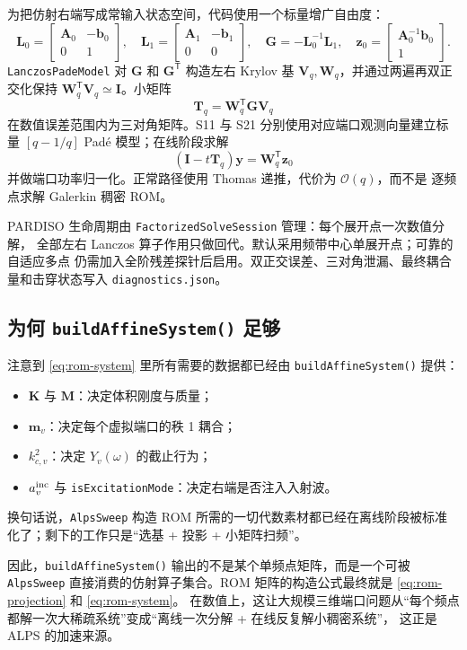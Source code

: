 \documentclass[UTF8,a4paper,11pt]{ctexart}
\newcommand{\transpose}{\mathsf{T}}
\newcommand{\code}[1]{\texttt{\small #1}}
\begin{document}
为把仿射右端写成常输入状态空间，代码使用一个标量增广自由度：
\begin{equation}
 \bm L_0=\begin{bmatrix}\bm A_0&-\bm b_0\\0&1\end{bmatrix},\quad
 \bm L_1=\begin{bmatrix}\bm A_1&-\bm b_1\\0&0\end{bmatrix},\quad
 \bm G=-\bm L_0^{-1}\bm L_1,\quad
 \bm z_0=\begin{bmatrix}\bm A_0^{-1}\bm b_0\\1\end{bmatrix}.
\end{equation}
\code{LanczosPadeModel} 对 $\bm G$ 和 $\bm G^{\transpose}$ 构造左右 Krylov 基
$\bm V_q,\bm W_q$，并通过两遍再双正交化保持
$\bm W_q^{\transpose}\bm V_q\simeq\bm I$。小矩阵
\begin{equation}
  \bm T_q=\bm W_q^{\transpose}\bm G\bm V_q
\end{equation}
在数值误差范围内为三对角矩阵。S11 与 S21 分别使用对应端口观测向量建立标量
$[q-1/q]$ Padé 模型；在线阶段求解
\begin{equation}
  (\bm I-t\bm T_q)\bm y=\bm W_q^{\transpose}\bm z_0
\end{equation}
并做端口功率归一化。正常路径使用 Thomas 递推，代价为 $\mathcal O(q)$，而不是
逐频点求解 Galerkin 稠密 ROM。

PARDISO 生命周期由 \code{FactorizedSolveSession} 管理：每个展开点一次数值分解，
全部左右 Lanczos 算子作用只做回代。默认采用频带中心单展开点；可靠的自适应多点
仍需加入全阶残差探针后启用。双正交误差、三对角泄漏、最终耦合量和击穿状态写入
\code{diagnostics.json}。

\subsection{为何 \code{buildAffineSystem()} 足够}

注意到 \eqref{eq:rom-system} 里所有需要的数据都已经由 \code{buildAffineSystem()} 提供：
\begin{itemize}[leftmargin=2em]
\item \(\bm K\) 与 \(\bm M\)：决定体积刚度与质量；
\item \(\bm m_v\)：决定每个虚拟端口的秩 1 耦合；
\item \(k_{c,v}^2\)：决定 \(Y_v(\omega)\) 的截止行为；
\item \(a_v^{\rm inc}\) 与 \code{isExcitationMode}：决定右端是否注入入射波。
\end{itemize}
换句话说，\code{AlpsSweep} 构造 ROM 所需的一切代数素材都已经在离线阶段被标准化了；剩下的工作只是“选基 + 投影 + 小矩阵扫频”。

\medskip

因此，\code{buildAffineSystem()} 输出的不是某个单频点矩阵，而是一个可被 \code{AlpsSweep}
直接消费的仿射算子集合。ROM 矩阵的构造公式最终就是 \eqref{eq:rom-projection} 和 \eqref{eq:rom-system}。
在数值上，这让大规模三维端口问题从“每个频点都解一次大稀疏系统”变成“离线一次分解 + 在线反复解小稠密系统”，
这正是 ALPS 的加速来源。
\end{document}
